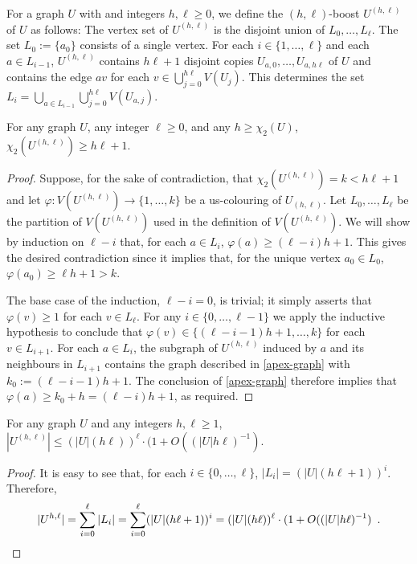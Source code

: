 \documentclass[kpfonts]{patmorin}
\newcommand{\uqs}{\chi_2}
\theoremstyle{named}
\begin{document}
For a graph $U$ with and integers $h,\ell\ge 0$, we define the $(h,\ell)$-boost $U^{(h,\ell)}$ of $U$ as follows: The vertex set of $U^{(h,\ell)}$ is the disjoint union of $L_0,\ldots,L_\ell$.  The set $L_0:=\{a_0\}$ consists of a single vertex. For each $i\in\{1,\ldots,\ell\}$ and each $a\in L_{i-1}$, $U^{(h,\ell)}$ contains $h\ell+1$ disjoint copies $U_{a,0},\ldots,U_{a,h\ell}$ of $U$ and contains the edge $av$ for each $v\in\bigcup_{j=0}^{h\ell} V(U_j)$.  This determines the set $L_i=\bigcup_{a\in L_{i-1}}\bigcup_{j=0}^{h\ell} V(U_{a,j})$.

\begin{lem}\label{boost}
    For any graph $U$, any integer $\ell\ge 0$, and any $h\ge\uqs(U)$, $\uqs(U^{(h,\ell)})\ge h\ell +1$.
\end{lem}

\begin{proof}
    Suppose, for the sake of contradiction, that $\uqs(U^{(h,\ell)})=k<h\ell+1$ and let $\varphi:V(U^{(h,\ell)})\to\{1,\ldots,k\}$ be a us-colouring of $U_{(h,\ell)}$.  Let $L_0,\ldots,L_{\ell}$ be the partition of $V(U^{(h,\ell)})$ used in the definition of $V(U^{(h,\ell)})$.
    We will show by induction on $\ell-i$ that, for each $a\in L_{i}$, $\varphi(a)\ge(\ell-i)h+1$. This gives the desired contradiction since it implies that, for the unique vertex $a_0\in L_0$, $\varphi(a_0)\ge \ell h+1 > k$.

    The base case of the induction, $\ell-i=0$, is trivial; it simply asserts that $\varphi(v)\ge 1$ for each $v\in L_\ell$.  For any $i\in\{0,\ldots,\ell-1\}$ we apply the inductive hypothesis to conclude that $\varphi(v)\in\{(\ell-i-1)h+1,\ldots,k\}$ for each $v\in L_{i+1}$.  For each $a\in L_i$, the subgraph of $U^{(h,\ell)}$ induced by $a$ and its neighbours in $L_{i+1}$ contains the graph described in \cref{apex-graph} with $k_0:=(\ell-i-1)h+1$.  The conclusion of \cref{apex-graph} therefore implies that $\varphi(a)\ge k_0+h=(\ell-i)h+1$, as required.
\end{proof}

\begin{lem}\label{boost-size}
    For any graph $U$ and any integers $h,\ell \ge 1$, $|U^{(h,\ell)}| \le (|U|(h\ell))^{\ell}\cdot (1+O((|U|h\ell)^{-1})$.
\end{lem}

\begin{proof}
    It is easy to see that, for each $i\in \{0,\ldots,\ell\}$, $|L_i|=(|U|(h\ell+1))^i$.  Therefore,
    \[ |U^{h,\ell}| = \sum_{i=0}^\ell |L_i| = \sum_{i=0}^\ell (|U|(h\ell+1))^i = (|U|(h\ell))^{\ell}\cdot (1+O((|U|h\ell)^{-1}) \enspace . \qedhere
    \]
\end{proof}
\end{document}
